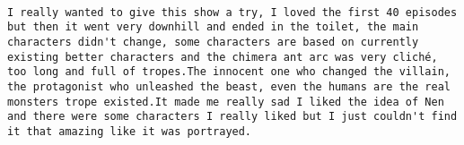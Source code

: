 \documentclass[
]{article}
\begin{document}
\begin{verbatim}
                                                                                                                                                                                                                                                                                                                                                                                                                                                                                                                                                                                                                                                                                                                                                                                                                                                                                                                                                                                                                                                                                                                                          I really wanted to give this show a try, I loved the first 40 episodes but then it went very downhill and ended in the toilet, the main characters didn't change, some characters are based on currently existing better characters and the chimera ant arc was very cliché, too long and full of tropes.The innocent one who changed the villain, the protagonist who unleashed the beast, even the humans are the real monsters trope existed.It made me really sad I liked the idea of Nen and there were some characters I really liked but I just couldn't find it that amazing like it was portrayed.

\end{verbatim}
\end{document}
